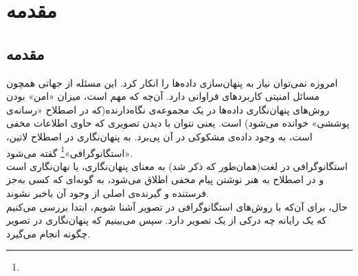 \section{مقدمه}\label{sec:subject}

\subsection{مقدمه}\label{subsec:subject-subject}


امروزه نمی‌توان نیاز به پنهان‌سازی داده‌ها را انکار کرد. این مسئله از جهاتی همچون مسائل امنیتی کاربردهای فراوانی دارد. آن‌چه که مهم است، میزان «امن» بودن روش‌های پنهان‌نگاری داده‌ها در یک مجموعه‌ی نگاه‌دارنده(که در اصطلاح «رسانه‌ی پوششی» خوانده می‌شود) است. یعنی نتوان با دیدن تصویری که حاوی اطلاعات مخفی است، به وجود داده‌ی مشکوکی در آن پی‌برد. به پنهان‌نگاری در اصطلاح لاتین، «استگانوگرافی»\footnote{}
 گفته می‌شود.\\
استگانوگرافی در لغت(همان‌طور که ذکر شد) به معنای پنهان‌نگاری، یا نهان‌نگاری است و در اصطلاح به هنر نوشتن پیام مخفی اطلاق می‌شود، به گونه‌ای که کسی به‌جز فرستنده و گیرنده‌ی اصلی از وجود آن باخبر نشوند.\cite{Ming}\\
حال، برای آن‌که با روش‌های استگانوگرافی در تصویر آشنا شویم، ابتدا بررسی می‌کنیم که یک رایانه چه درکی از یک تصویر دارد. سپس می‌بینیم که پنهان‌نگاری در تصویر چگونه انجام می‌گیرد.

\cleardoublepage 